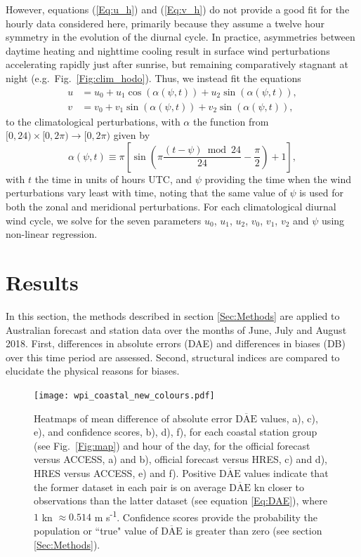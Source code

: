 \documentclass[twocol]{ametsoc}
\begin{document}
However, equations (\ref{Eq:u_h}) and (\ref{Eq:v_h}) do not provide a good fit for the hourly data considered here, primarily because they assume a twelve hour symmetry in the evolution of the diurnal cycle. In practice, asymmetries between daytime heating and nighttime cooling \citep[e.g.][]{svensson11} result in surface wind perturbations accelerating rapidly just after sunrise, but remaining comparatively stagnant at night (e.g.~Fig.~\ref{Fig:clim_hodo}). Thus, we instead fit the equations
\begin{align}
u &= u_0 + u_1 \cos(\alpha(\psi,t)) + u_2 \sin(\alpha(\psi,t)), \label{Eq:u} \\
v &= v_0 + v_1 \sin(\alpha(\psi,t)) + v_2 \sin(\alpha(\psi,t)), \label{Eq:v}
\end{align}
to the climatological perturbations, with $\alpha$ the function from $[0,24) \times [0, 2\pi) \to [0, 2\pi)$ given by
\begin{equation}
\alpha(\psi,t) \equiv \pi \left[\sin\left( \pi \frac{(t - \psi)  \bmod 24}{24} - \frac{\pi}{2} \right) + 1 \right], \label{Eq:alpha}
\end{equation}
with $t$ the time in units of hours UTC, and $\psi$ providing the time when the wind perturbations vary least with time, noting that the same value of $\psi$ is used for both the zonal and meridional perturbations. For each climatological diurnal wind cycle, we solve for the seven parameters $u_0$, $u_1$, $u_2$, $v_0$, $v_1$, $v_2$ and $\psi$ using non-linear regression.

\section{Results}
\label{Sec:Results}
In this section, the methods described in section \ref{Sec:Methods} are applied to Australian forecast and station data over the months of June, July and August 2018. First, differences in absolute errors (DAE) and differences in biases (DB) over this time period are assessed. Second, structural indices are compared to elucidate the physical reasons for biases. 

\begin{figure}
\centering
\texttt{[image: wpi\_coastal\_new\_colours.pdf]}
\caption{Heatmaps of mean difference of absolute error $\overline{\text{DAE}}$ values, a), c), e), and confidence scores, b), d), f), for each coastal station group (see Fig.~\ref{Fig:map}) and hour of the day, for the official forecast versus ACCESS, a) and b), official forecast versus HRES, c) and d), HRES versus ACCESS, e) and f). Positive $\overline{\text{DAE}}$ values indicate that the former dataset in each pair is on average $\overline{\text{DAE}}$ kn closer to observations than the latter dataset (see equation \ref{Eq:DAE}), where $1$ kn $\approx 0.514$ m s\textsuperscript{-1}. Confidence scores provide the probability the population or ``true" value of $\overline{\text{DAE}}$ is greater than zero (see section \ref{Sec:Methods}).}
\label{Fig:wpi_coastal}
\end{figure}
\end{document}
